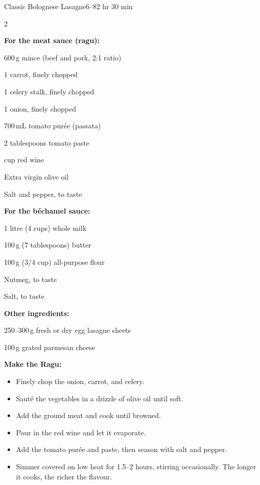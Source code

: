 \begin{recipebox}{Classic Bolognese Lasagne}{6--8}{2 hr 30 min}

  \begin{ingredients}
    \begin{multicols}{2}
      \item \textbf{For the meat sauce (ragu):}
      \item 600\,g mince (beef and pork, 2:1 ratio)
      \item 1 carrot, finely chopped
      \item 1 celery stalk, finely chopped
      \item 1 onion, finely chopped
      \item 700\,mL tomato purée (passata)
      \item 2 tablespoons tomato paste
      \item {} cup red wine
      \item Extra virgin olive oil
      \item Salt and pepper, to taste
      \columnbreak
      \item \textbf{For the béchamel sauce:}
      \item 1 litre (4 cups) whole milk
      \item 100\,g (7 tablespoons) butter
      \item 100\,g (3/4 cup) all-purpose flour
      \item Nutmeg, to taste
      \item Salt, to taste
      \vspace{0.4em}
      \item \textbf{Other ingredients:}
      \item 250--300\,g fresh or dry egg lasagne sheets
      \item 100\,g grated parmesan cheese
    \end{multicols}
  \end{ingredients}

  \vspace{-1em}
  \begin{method}
    \item \textbf{Make the Ragu:}
    \begin{itemize}[leftmargin=2em]
      \item Finely chop the onion, carrot, and celery.
      \item Sauté the vegetables in a drizzle of olive oil until soft.
      \item Add the ground meat and cook until browned.
      \item Pour in the red wine and let it evaporate.
      \item Add the tomato purée and paste, then season with salt and pepper.
      \item Simmer covered on low heat for 1.5--2 hours, stirring occasionally. The longer it cooks, the richer the flavour.
    \end{itemize}


\end{method}
\end{recipebox}
